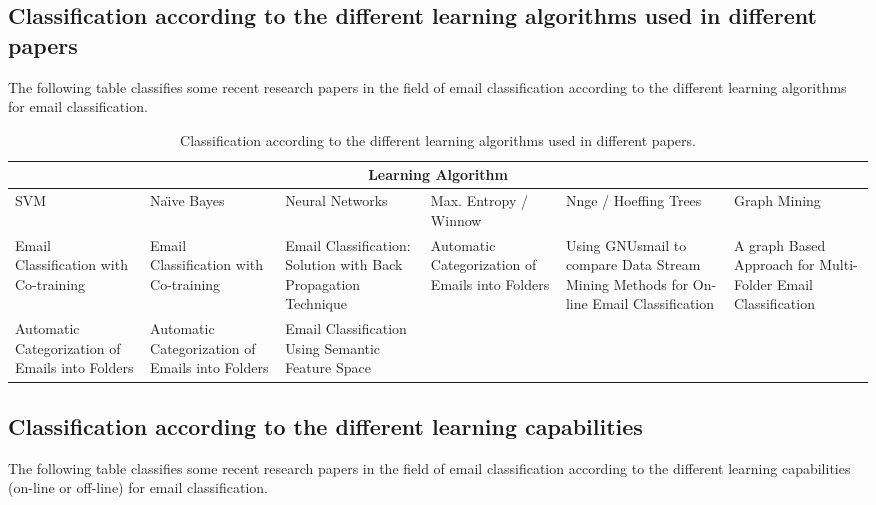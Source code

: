 \subsection{Classification according to the different learning algorithms used in different papers}
The following table classifies some recent research papers in the field of email classification according to the different learning algorithms for email classification.
\begin{center}
\begin{table}
\begin{tabular}{|p{2cm}|p{2cm}|p{2cm}|p{2cm}|p{2cm}|p{2cm}|}
\hline
\multicolumn{6}{|c|}{Learning Algorithm} \\
\hline
SVM & Na\"{\i}ve Bayes & Neural Networks & Max. Entropy / Winnow & Nnge / Hoeffing Trees & Graph Mining \\ \hline
Email Classification with Co-training \cite{SVETLANA01} &
Email Classification with Co-training \cite{SVETLANA01} &
Email Classification: Solution with Back Propagation Technique \cite{mous05} & 
Automatic Categorization of Emails into Folders \cite{RON04} &
Using GNUsmail to compare Data Stream Mining Methods for On-line Email Classification \cite{JOSE11} &
A graph Based Approach for Multi-Folder Email Classification \cite{sift02} \\ \hline

Automatic Categorization of Emails into Folders \cite{RON04} &
Automatic Categorization of Emails into Folders \cite{RON04} &
Email Classification Using Semantic Feature Space \cite{YUN08} & 
&
& \\ \hline
\end{tabular}
\caption{Classification according to the different learning algorithms used in different papers.}
\end{table}
\end{center}
\newpage

\subsection{Classification according to the different learning capabilities}
The following table classifies some recent research papers in the field of email classification according to the different learning capabilities (on-line or off-line) for email classification.

